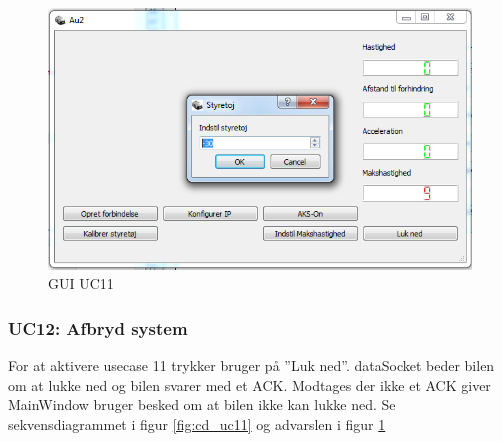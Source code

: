 \begin{figure}[H]
\centering
\includegraphics[width=\textwidth* 3/4,height=\textwidth* 9/20 ]{../fig/billeder/gui_uc11.png}
\caption{GUI UC11}
\label{fig:GUI_uc11}
\end{figure}

\subsubsection{UC12: Afbryd system}
For at aktivere usecase 11 trykker bruger på ''Luk ned''.
dataSocket beder bilen om at lukke ned og bilen svarer med et ACK. Modtages der ikke et ACK giver MainWindow bruger besked om at bilen ikke kan lukke ned. Se sekvensdiagrammet i figur \ref{fig:cd_uc11} og advarslen i figur \ref{fig:GUI_uc11}

